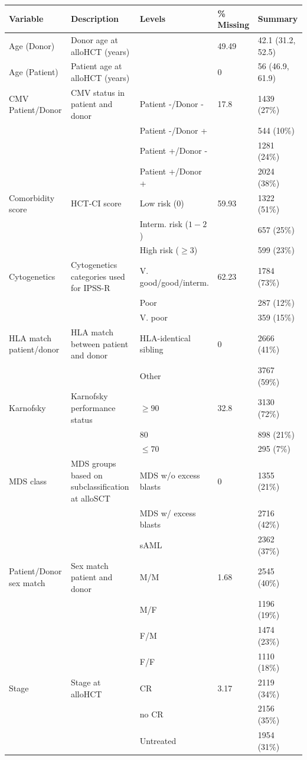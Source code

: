 \documentclass[
  letterpaper,
  DIV=11,
  numbers=noendperiod]{scrreprt}
\begin{document}
\begin{landscape}
\begin{table}
\begin{tabular}[t]{lllll}
\toprule
Variable & Description & Levels & \% Missing & Summary\\
\midrule
Age (Donor) & Donor age at alloHCT (years) &  & 49.49 & 42.1 (31.2, 52.5)\\
Age (Patient) & Patient age at alloHCT (years) &  & 0 & 56 (46.9, 61.9)\\
CMV Patient/Donor & CMV status in patient and donor & Patient -/Donor - & 17.8 & 1439 (27\%)\\
 &  & Patient -/Donor + &  & 544 (10\%)\\
 &  & Patient +/Donor - &  & 1281 (24\%)\\
 &  & Patient +/Donor + &  & 2024 (38\%)\\
Comorbidity score & HCT-CI score & Low risk (0) & 59.93 & 1322 (51\%)\\
 &  & Interm. risk ($1-2$) &  & 657 (25\%)\\
 &  & High risk ($\geq3$) &  & 599 (23\%)\\
Cytogenetics & Cytogenetics categories used for IPSS-R & V. good/good/interm. & 62.23 & 1784 (73\%)\\
 &  & Poor &  & 287 (12\%)\\
 &  & V. poor &  & 359 (15\%)\\
HLA match patient/donor & HLA match between patient and donor & HLA-identical sibling & 0 & 2666 (41\%)\\
 &  & Other &  & 3767 (59\%)\\
Karnofsky & Karnofsky performance status & $\geq90$ & 32.8 & 3130 (72\%)\\
 &  & 80 &  & 898 (21\%)\\
 &  & $\leq70$ &  & 295 (7\%)\\
MDS class & MDS groups based on subclassification at alloSCT & MDS w/o excess blasts & 0 & 1355 (21\%)\\
 &  & MDS w/ excess blasts &  & 2716 (42\%)\\
 &  & sAML &  & 2362 (37\%)\\
Patient/Donor sex match & Sex match patient and donor & M/M & 1.68 & 2545 (40\%)\\
 &  & M/F &  & 1196 (19\%)\\
 &  & F/M &  & 1474 (23\%)\\
 &  & F/F &  & 1110 (18\%)\\
Stage & Stage at alloHCT & CR & 3.17 & 2119 (34\%)\\
 &  & no CR &  & 2156 (35\%)\\
 &  & Untreated &  & 1954 (31\%)\\
\bottomrule
\end{tabular}
\endgroup{}
\end{table}
\end{landscape}
\end{document}
